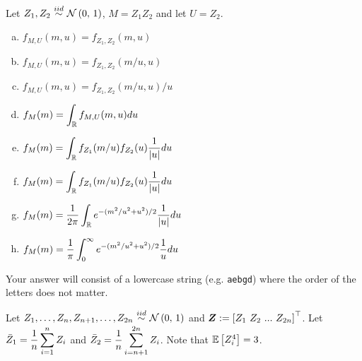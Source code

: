 \documentclass[12pt,landscape]{article}
\newcommand{\instr}{\small Your answer will consist of a lowercase string (e.g. \texttt{aebgd}) where the order of the letters does not matter. \normalsize}
\begin{document}
\problem{} Let $Z_1, Z_2 \iid \stdnormnot$, $M = Z_1 Z_2$ and let $U = Z_2$.

\vspace{-0.2cm}\benum{} 

\begin{enumerate}[(a)]
\item $f_{M, U}(m, u) =  f_{Z_1, Z_2}(m, u)$
\item $f_{M, U}(m, u) =  f_{Z_1, Z_2}(m/u, u)$
\item $f_{M, U}(m, u) =  f_{Z_1, Z_2}(m/u, u)/u$
\item $f_{M}(m) =  \displaystyle\int_{\mathbb{R}} f_{M, U}(m, u) du$
\item $f_{M}(m) =  \displaystyle\int_{\mathbb{R}} f_{Z_1}(m/u) f_{Z_2}(u)\frac{1}{|u|} du$
\item $f_{M}(m) =  \displaystyle\int_{\mathbb{R}} f_{Z_1}(m/u) f_{Z_2}(u)\frac{1}{|u|} du$
\item $f_{M}(m) =  \displaystyle\frac{1}{2\pi}\int_{\mathbb{R}} e^{-(m^2/u^2 + u^2) / 2} \frac{1}{|u|} du$
\item $f_{M}(m) =  \displaystyle\frac{1}{\pi}\int_0^\infty e^{-(m^2/u^2 + u^2) / 2} \frac{1}{u} du$
\end{enumerate}
\eenum\instr\pagebreak


\problem{} Let $Z_1, \ldots, Z_n, Z_{n+1}, \ldots, Z_{2n} \iid \stdnormnot$ and $\boldsymbol{Z} := \left[Z_1~Z_2~ ...~ Z_{2n}\right]^\top$. Let $\bar{Z}_1  = \displaystyle\frac{1}{n}\sum_{i=1}^n Z_i$ and $\bar{Z}_2  = \displaystyle\frac{1}{n}\sum_{i=n+1}^{2n} Z_i$. Note that $\mathbb{E}\left[Z_i^4\right] = 3$.

\vspace{-0.2cm}\benum{} 
\end{document}
